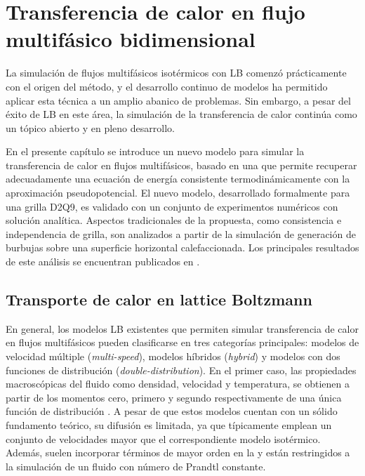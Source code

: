 \chapter{Transferencia de calor en flujo multif\'asico bidimensional}
\label{chap:modelo2D}

La simulaci\'on de flujos multif\'asicos isot\'ermicos con LB comenz\'o pr\'acticamente con el origen del m\'etodo, y el desarrollo continuo de modelos ha permitido aplicar esta t\'ecnica a un amplio abanico de problemas. Sin embargo, a pesar del \'exito de LB en este \'area, la simulaci\'on de la transferencia de calor contin\'ua como un t\'opico abierto y en pleno desarrollo.

En el presente cap\'itulo se introduce un nuevo modelo para simular la transferencia de calor en flujos multif\'asicos, basado en una \lbe{} que permite recuperar adecuadamente una ecuaci\'on de energ\'ia consistente termodin\'amicamente con la aproximaci\'on pseudopotencial. El nuevo modelo, desarrollado formalmente para una grilla D2Q9, es validado con un conjunto de experimentos num\'ericos con soluci\'on anal\'itica. Aspectos tradicionales de la propuesta, como consistencia e independencia de grilla, son analizados a partir de la simulaci\'on de generaci\'on de burbujas sobre una superficie horizontal calefaccionada. Los principales resultados de este an\'alisis se encuentran publicados en \cite{fogliatto_assessment_2021}.


\section{Transporte de calor en lattice Boltzmann}

En general, los modelos LB existentes que permiten simular transferencia de calor en flujos multif\'asicos pueden clasificarse en tres categor\'ias principales: modelos de velocidad m\'ultiple (\emph{multi-speed}), modelos h\'ibridos (\emph{hybrid}) y modelos con dos funciones de distribuci\'on (\emph{double-distribution}). En el primer caso, las propiedades macrosc\'opicas del fluido como densidad, velocidad y temperatura, se obtienen a partir de los momentos cero, primero y segundo respectivamente de una \'unica funci\'on de distribuci\'on \cite{succi_lattice_2018,alexander_lattice_1993}. A pesar de que estos modelos cuentan con un s\'olido fundamento te\'orico, su difusi\'on es limitada, ya que t\'ipicamente emplean un conjunto de velocidades mayor que el correspondiente modelo isot\'ermico. Adem\'as, suelen incorporar t\'erminos de mayor orden en la \edf{} y est\'an restringidos a la simulaci\'on de un fluido con n\'umero de Prandtl constante.

